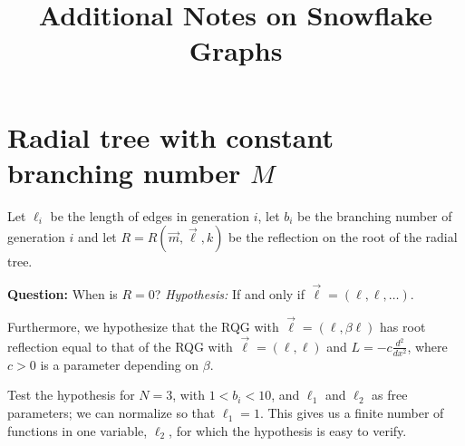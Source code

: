 \documentclass[a4paper,11pt]{article}
\begin{document}
\title{Additional Notes on Snowflake Graphs}
\maketitle

\section{Radial tree with constant branching number $M$}

Let $\ell_i$ be the length of edges in generation $i$, let $b_i$ be the branching number of generation $i$ and let $R = R(\vec{m}, \vec{\ell}, k)$ be the reflection on the root of the radial tree.

{\bf Question:} When is $R = 0$? {\it Hypothesis:} If and only if $\vec{\ell} = (\ell, \ell, \ldots)$.

Furthermore, we hypothesize that the RQG with $\vec{\ell} = (\ell, \beta\ell)$ has root reflection equal to that of the RQG with $\vec{\ell} = (\ell, \ell)$ and $L = -c\frac{d^2}{dx^2}$, where $c>0$ is a parameter depending on $\beta$.

Test the hypothesis for $N=3$, with $1 < b_i < 10$, and $\ell_1$ and $\ell_2$ as free parameters; we can normalize so that $\ell_1 = 1$. This gives us a finite number of functions in one variable, $\ell_2$, for which the hypothesis is easy to verify.
\end{document}
